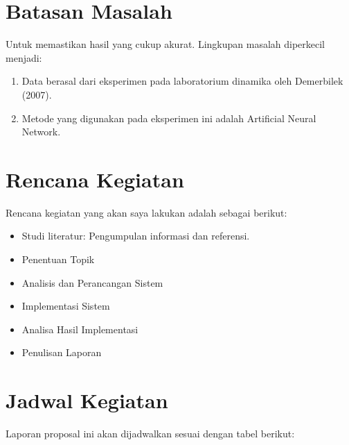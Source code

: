 \section{Batasan Masalah}
Untuk memastikan hasil yang cukup akurat. Lingkupan masalah diperkecil menjadi:
\begin{enumerate}
    \item Data berasal dari eksperimen pada laboratorium dinamika oleh Demerbilek (2007).
    \item Metode yang digunakan pada eksperimen ini adalah Artificial Neural Network.
\end{enumerate}
\section{Rencana Kegiatan}
Rencana kegiatan yang akan saya lakukan adalah sebagai berikut:
\begin{itemize}
    \item Studi literatur: Pengumpulan informasi dan referensi.
    \item Penentuan Topik
    \item Analisis dan Perancangan Sistem
    \item Implementasi Sistem
    \item Analisa Hasil Implementasi
    \item Penulisan Laporan
\end{itemize}
\section{Jadwal Kegiatan}

Laporan proposal ini akan dijadwalkan sesuai dengan tabel berikut:

